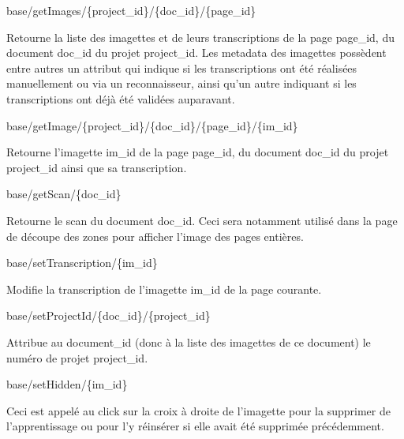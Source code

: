\begin{description}[align=left]
\item [GET] base/getImages/\{project\_id\}/\{doc\_id\}/\{page\_id\}\newline{}
\begin{itshape}
Retourne la liste des imagettes et de leurs transcriptions de la page page\_id, du document doc\_id du projet project\_id. Les metadata des imagettes possèdent entre autres un attribut qui indique si les transcriptions ont été réalisées manuellement ou via un reconnaisseur, ainsi qu'un autre indiquant si les transcriptions ont déjà été validées auparavant.
\end{itshape}

\item [GET] base/getImage/\{project\_id\}/\{doc\_id\}/\{page\_id\}/\{im\_id\}\newline{}
\begin{itshape}
Retourne l'imagette im\_id de la page page\_id, du document doc\_id du projet project\_id ainsi que sa transcription.
\end{itshape}

\item [GET] base/getScan/\{doc\_id\}\newline{}
\begin{itshape}
Retourne le scan du document doc\_id. Ceci sera notamment utilisé dans la page de découpe des zones pour afficher l'image des pages entières.
\end{itshape}

\item [POST] base/setTranscription/\{im\_id\}\newline{}
\begin{itshape}
Modifie la transcription de l'imagette im\_id de la page courante.
\end{itshape}

\item [POST] base/setProjectId/\{doc\_id\}/\{project\_id\}\newline{}
\begin{itshape}
Attribue au document\_id (donc à la liste des imagettes de ce document) le numéro de projet project\_id.
\end{itshape}

\item [POST] base/setHidden/\{im\_id\}\newline{}
\begin{itshape}
Ceci est appelé au click sur la croix à droite de l'imagette pour la supprimer de l'apprentissage ou pour l'y réinsérer si elle avait été supprimée précédemment.
\end{itshape}

\end{description}